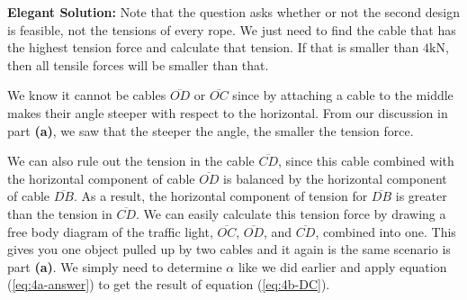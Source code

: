 \documentclass{article}
\begin{document}
\textbf{Elegant Solution:} Note that the question asks whether or not the second design is feasible, not the tensions of every rope. We just need to find the cable that has the highest tension force and calculate that tension. If that is smaller than  $4\si{\kilo\newton}$, then all tensile forces will be smaller than that.

We know it cannot be cables $\overline{OD}$ or $\overline{OC}$ since by attaching a cable to the middle makes their angle steeper with respect to the horizontal. From our discussion in part \textbf{(a)}, we saw that the steeper the angle, the smaller the tension force.

We can also rule out the tension in the cable $\overline{CD}$, since this cable combined with the horizontal component of cable $\overline{OD}$ is balanced by the horizontal component of cable $\overline{DB}$. As a result, the horizontal component of tension for $\overline{DB}$ is greater than the tension in $\overline{CD}$. We can easily calculate this tension force by drawing a free body diagram of the traffic light, $\overline{OC}$, $\overline{OD}$, and $\overline{CD}$, combined into one. This gives you one object pulled up by two cables and it again is the same scenario is part \textbf{(a)}. We simply need to determine $\alpha$ like we did earlier and apply equation (\ref{eq:4a-answer}) to get the result of equation (\ref{eq:4b-DC}).

\newpage
\end{document}
